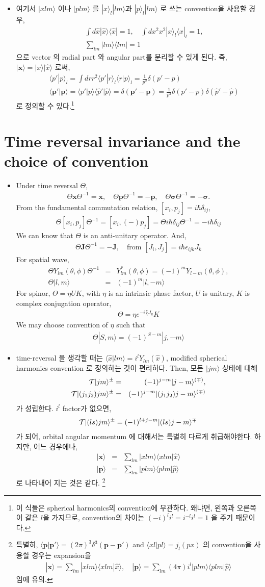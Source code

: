\documentclass[10pt]{book}
\def\bm{\boldsymbol}
\newcommand{\bea}{\begin{eqnarray}}
\newcommand{\eea}{\end{eqnarray}}
\newcommand{\no}{\nonumber \\}
\def\vs{{\bm \sigma}}
\def\vp{{\bm p}}
\def\vx{{\bm x}}
\def\la{\langle}
\def\ra{\rangle}
\begin{document}
\begin{itemize}
\item 
여기서 $|x lm\ra$ 이나 $|p lm\ra$ 를 $|x\ra_l |lm\ra$과 $|p\ra_l |lm\ra$ 로 쓰는 
convention을 사용할 경우,
\bea
& &\int d\hat{x}|\hat{x}\ra\la \hat{x}|=1,\quad
\int dx^2 x^2 |x\ra_l \la x|_l=1,\no
& &\sum_{lm}|lm\ra\la lm|=1
\eea
으로 vector 의 radial part 와 angular part를 분리할 수 있게 된다.
즉, $|\vx\ra=|x\ra|\hat{x}\ra$ 로써, 
\bea
& &\la p'|p\ra_l=\int dr r^2 \la p'|r\ra_l \la r|p\ra_l=\frac{1}{p^2}\delta(p'-p)\no
& &\la \vp'|\vp\ra=\la p'|p\ra\la \hat{p}'|\hat{p}\ra 
    =\delta(\vp'-\vp)=\frac{1}{p^2}\delta(p'-p) \delta(\hat{p}'-\hat{p})
\eea
로 정의할 수 있다.\footnote{이 식들은 spherical harmonics의 convention에 무관하다.
왜냐면, 왼쪽과 오른쪽이 같은 $l$을 가지므로, convention의 차이는 
$(-i)^l i^l=i^{-l}i^l=1$ 을 주기 때문이다.
}

\end{itemize}

\section{Time reversal invariance and the choice of convention}
\begin{itemize} 
\item Under time reversal $\Theta$,
\bea 
\Theta\vx\Theta^{-1}=\vx, \quad \Theta\vp\Theta^{-1}=-\vp ,\quad 
\Theta \vs \Theta^{-1}=-\vs.
\eea 
From the fundamental commutation relation, $[x_i,p_j]=i\hbar\delta_{ij}$, 
\bea 
\Theta [x_i,p_j]\Theta^{-1}=[x_i,(-)p_j]
=\Theta i\hbar \delta_{ij} \Theta^{-1}=-i\hbar\delta_{ij}
\eea 
We can know that $\Theta$ is an anti-unitary operator.
And,
\bea 
\Theta {\bm J}\Theta^{-1}=-{\bm J},
\quad \mbox{from } [J_i,J_j]=i\hbar\epsilon_{ijk}J_k
\eea 
For spatial wave,
\bea 
\Theta Y_{lm}(\theta,\phi)\Theta^{-1}
&=&Y_{lm}^*(\theta,\phi)
    =(-1)^m Y_{l-m}(\theta,\phi),\no  
\Theta|l,m\ra &=& (-1)^m|l,-m\ra     
\eea 
For spinor, $\Theta=\eta U K $, with $\eta$ is an intrinsic
phase factor, $U$ is unitary, $K$ is complex conjugation operator,
\bea 
\Theta= \eta e^{-i\frac{\pi}{\hbar} J_y} K
\eea  
We may choose convention of $\eta$ such that
\bea 
\Theta |S,m\ra =(-1)^{S-m}|j,-m\ra 
\eea 

\item time-reversal 을 생각할 때는 
$\la \hat{x}| lm\ra=i^l Y_{lm}(\hat{x})$, modified spherical harmonics convention
로 정의하는 것이 편리하다. 
Then,  모든 $|j m\ra$ 상태에 대해
\bea
{\cal T}|j m\ra^{\pm}&=&(-1)^{j-m}|j -m\ra^{(\mp)},\no
{\cal T}|(j_1 j_2) j m\ra^{\pm}&=&(-1)^{j-m}|(j_1 j_2) j -m\ra^{(\mp)}
\eea
가 성립한다. $i^l$ factor가 없으면, 
\bea
{\cal T}|(l s) j m\ra^{\pm}=
(-1)^{l+j-m}|(l s) j -m\ra^{\mp}
\eea
가 되어, orbital angular momentum 에 대해서는 특별히 다르게 취급해야한다. 하지만,
어느 경우에나,
\bea
|\vx\ra&=&\sum_{lm} |x lm\ra \la x lm|\hat{x}\ra\no
|\vp\ra&=&\sum_{lm} |p lm\ra \la p lm|\hat{p}\ra
\eea
로 나타내어 지는 것은 같다. \footnote{
특별히, $\la \vp|\vp'\ra=(2\pi)^3\delta^{3}(\vp-\vp')$
and $\la x l| p l\ra=j_l(px)$ 의 convention을 사용할 경우는
expansion을
\bea
|\vx\ra=\sum_{lm}|x lm\ra \la x lm|\hat{x}\ra,\quad 
|\vp\ra=\sum_{lm} (4\pi) i^l |p lm\ra \la plm|\hat{p}\ra
\eea
임에 유의.
}
\end{itemize}
\end{document}
